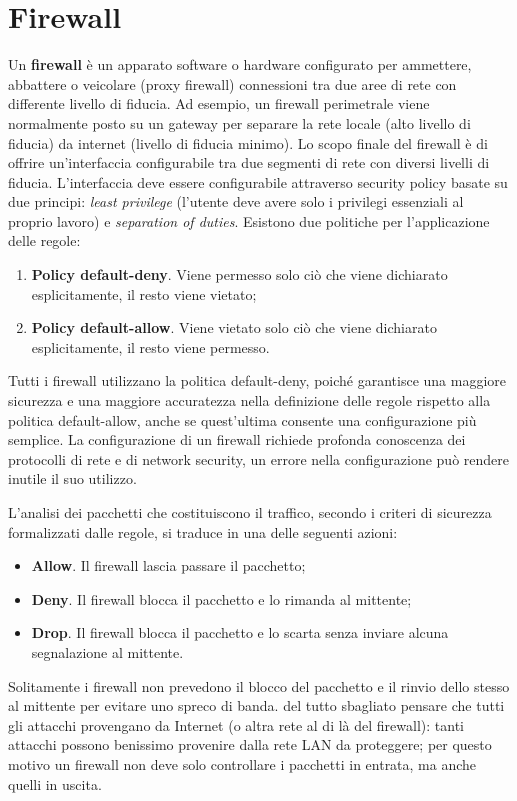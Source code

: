 \chapter{Firewall}
Un \textbf{firewall} è un apparato software o hardware configurato per ammettere, abbattere o veicolare (proxy firewall) connessioni tra due aree di rete con differente livello di fiducia. Ad esempio, un firewall perimetrale viene normalmente posto su un gateway per separare la rete locale (alto livello di fiducia) da internet (livello di fiducia minimo). Lo scopo finale del firewall è di offrire un'interfaccia configurabile tra due segmenti di rete con diversi livelli di fiducia. L'interfaccia deve essere configurabile attraverso security policy basate su due principi: \textit{least privilege} (l'utente deve avere solo i privilegi essenziali al proprio lavoro) e \textit{separation of duties}. Esistono due politiche per l'applicazione delle regole:
\begin{enumerate}
	\item \textbf{Policy default-deny}. Viene permesso solo ciò che viene dichiarato esplicitamente, il resto viene vietato;
	\item \textbf{Policy default-allow}. Viene vietato solo ciò che viene dichiarato esplicitamente, il resto viene permesso.
\end{enumerate}
Tutti i firewall utilizzano la politica default-deny, poiché garantisce una maggiore sicurezza e una maggiore accuratezza nella definizione delle regole rispetto alla politica default-allow, anche se quest'ultima consente una configurazione più semplice. La configurazione di un firewall richiede profonda conoscenza dei protocolli di rete e di network security, un errore nella configurazione può rendere inutile il suo utilizzo.

L'analisi dei pacchetti che costituiscono il traffico, secondo i criteri di sicurezza formalizzati dalle regole, si traduce in una delle seguenti azioni:
\begin{itemize}
	\item \textbf{Allow}. Il firewall lascia passare il pacchetto;
	\item \textbf{Deny}. Il firewall blocca il pacchetto e lo rimanda al mittente;
	\item \textbf{Drop}. Il firewall blocca il pacchetto e lo scarta senza inviare alcuna segnalazione al mittente.
\end{itemize}
Solitamente i firewall non prevedono il blocco del pacchetto e il rinvio dello stesso al mittente per evitare uno spreco di banda. del tutto sbagliato pensare che tutti gli attacchi provengano da Internet (o altra rete al di là del firewall): tanti attacchi possono benissimo provenire dalla rete LAN da proteggere; per questo motivo un firewall non deve solo controllare i pacchetti in entrata, ma anche quelli in uscita.

